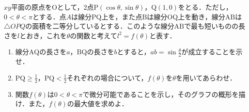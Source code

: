 $xy$平面の原点を$\mathrm{O}$として，$2$点$\mathrm{P}(\cos\theta,\sin\theta)$，$\mathrm{Q}(1,0)$をとる．ただし，$0<\theta<\pi$とする．点$A$は線分$\mathrm{PQ}$上を，また点$\mathrm{B}$は線分$\mathrm{OQ}$上を動き，線分$\mathrm{AB}$は$\triangle OPQ$の面積を二等分しているとする．このような線分$\mathrm{AB}$で最も短いものの長さを$l$とおき，これを$\theta$の関数と考えて$l^2=f(\theta)$と表す．
\begin{enumerate}
  \item 線分$\mathrm{AQ}$の長さを$a$，$\mathrm{BQ}$の長さを$b$とすると，$ab=\sin\frac{\theta}{2}$が成立することを示せ．
  \item $\mathrm{PQ}\ge \frac{1}{2}$，$\mathrm{PQ}<\frac{1}{2}$それぞれの場合について，$f(\theta)$を$\theta$を用いてあらわせ．
  \item 関数$f(\theta)$は$0<\theta<\pi$で微分可能であることを示し，そのグラフの概形を描け．また，$f(\theta)$の最大値を求めよ．
\end{enumerate}
